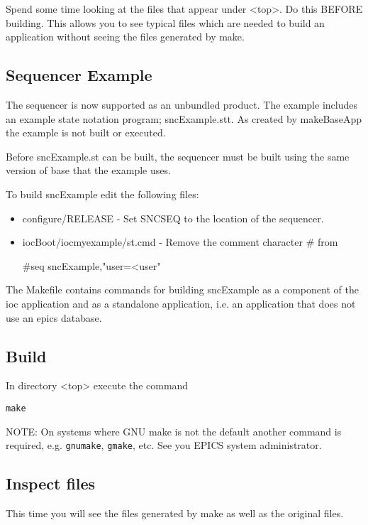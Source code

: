 Spend some time looking at the files that appear under \textless{}top\textgreater{}. Do this BEFORE building. This allows you to see typical 
files which are needed to build an application without seeing the files generated by make.

\subsection{Sequencer Example}

The sequencer is now supported as an unbundled product. The example includes an example state notation program; 
sncExample.stt. As created by makeBaseApp the example is not built or executed.

Before sncExample.st can be built, the sequencer must be built using the same version of base that the example uses.

To build sncExample edit the following files:

\begin{itemize}
\item configure/RELEASE - Set SNCSEQ to the location of the sequencer.
\item iocBoot/iocmyexample/st.cmd - Remove the comment character \# from 

\#seq sncExample,"user=\textless{}user"
\end{itemize}

The Makefile contains commands for building sncExample as a component of the ioc application and as a standalone 
application, i.e. an application that does not use an epics database.

\subsection{Build}

In directory \textless{}top\textgreater{} execute the command

\begin{verbatim}make
\end{verbatim}NOTE: On systems where GNU make is not the default another command is required, e.g. \verb|gnumake|, \verb|gmake|, etc. See 
you EPICS system administrator.

\subsection{Inspect files}

This time you will see the files generated by make as well as the original files.

